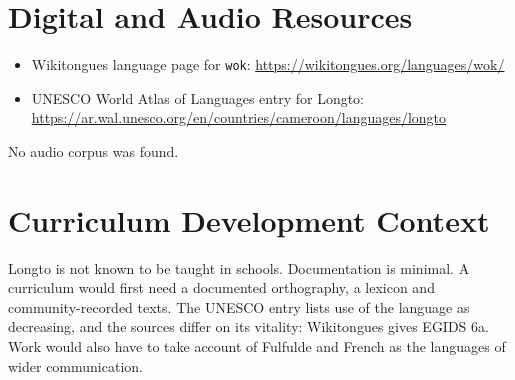 \documentclass[12pt]{article}
\begin{document}
\section{Digital and Audio Resources}
\begin{itemize}
\item Wikitongues language page for \texttt{wok}: \url{https://wikitongues.org/languages/wok/}
\item UNESCO World Atlas of Languages entry for Longto: \url{https://ar.wal.unesco.org/en/countries/cameroon/languages/longto}
\end{itemize}
No audio corpus was found.

\section{Curriculum Development Context}
Longto is not known to be taught in schools. Documentation is minimal. A curriculum would first need a documented orthography, a lexicon and community-recorded texts. The UNESCO entry lists use of the language as decreasing, and the sources differ on its vitality: Wikitongues gives EGIDS 6a. Work would also have to take account of Fulfulde and French as the languages of wider communication.
\end{document}
